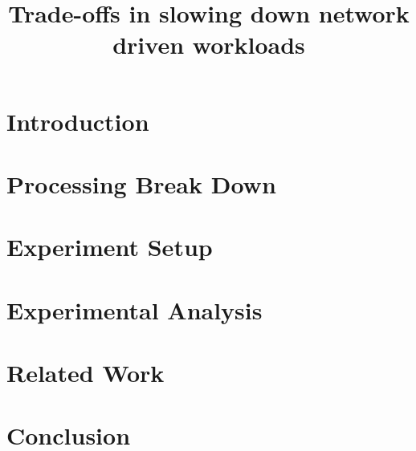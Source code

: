 \documentclass[sigplan,10pt]{acmart}
\begin{document}
\title{Trade-offs in slowing down network driven workloads}


\maketitle
\pagestyle{plain} %

\section{Introduction}


\section{Processing Break Down}


\section{Experiment Setup}
\label{sec:exp_setup}


\section{Experimental Analysis}





\section{Related Work}


\section{Conclusion}


%



\appendix


\end{document}
